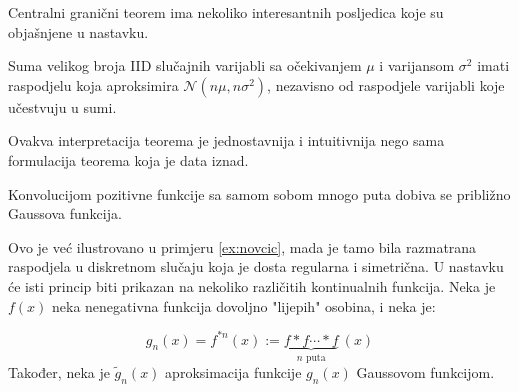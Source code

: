 Centralni granični teorem ima nekoliko interesantnih posljedica koje su
objašnjene u nastavku.

\setcounter{corollary}{0}
\begin{corollary}

  Suma velikog broja IID slučajnih varijabli sa očekivanjem $\mu$ i varijansom
  $\sigma^2$ imati raspodjelu koja aproksimira $\mathcal{N}(n\mu, n\sigma^2)$,
  nezavisno od raspodjele varijabli koje učestvuju u sumi. 

\end{corollary}

Ovakva interpretacija teorema je jednostavnija i intuitivnija nego sama
formulacija teorema koja je data iznad.



\begin{corollary}
  Konvolucijom pozitivne funkcije sa samom sobom mnogo puta dobiva se približno
  Gaussova funkcija.
\end{corollary}

Ovo je već ilustrovano u primjeru \ref{ex:novcic}, mada je tamo bila razmatrana
raspodjela u diskretnom slučaju koja je dosta regularna i simetrična. U nastavku
će isti princip biti prikazan na nekoliko različitih kontinualnih funkcija. Neka
je $f(x)$ neka nenegativna funkcija dovoljno "lijepih" osobina, i neka je:

\begin{equation}
  g_n(x) = f^{*n}(x) := \underbrace{f*f\cdots*f}_{n\text{ puta}}\ (x)
\end{equation}
%
Također, neka je $\widetilde{g}_n(x)$ aproksimacija funkcije $g_n(x)$ Gaussovom
funkcijom. \\

